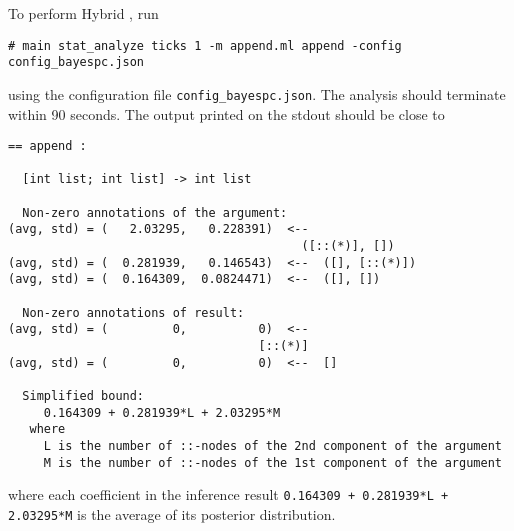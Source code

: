 To perform Hybrid \BayesPC{}, run
\begin{verbatim}
# main stat_analyze ticks 1 -m append.ml append -config config_bayespc.json
\end{verbatim}
using the configuration file \texttt{config\_bayespc.json}.
%
The analysis should terminate within 90 seconds.
%
The output printed on the stdout should be close to
\begin{verbatim}
== append :

  [int list; int list] -> int list

  Non-zero annotations of the argument:
(avg, std) = (   2.03295,   0.228391)  <--
                                         ([::(*)], [])
(avg, std) = (  0.281939,   0.146543)  <--  ([], [::(*)])
(avg, std) = (  0.164309,  0.0824471)  <--  ([], [])

  Non-zero annotations of result:
(avg, std) = (         0,          0)  <--
                                   [::(*)]
(avg, std) = (         0,          0)  <--  []

  Simplified bound:
     0.164309 + 0.281939*L + 2.03295*M
   where
     L is the number of ::-nodes of the 2nd component of the argument
     M is the number of ::-nodes of the 1st component of the argument
\end{verbatim}
where each coefficient in the inference result \texttt{0.164309 + 0.281939*L +
  2.03295*M} is the average of its posterior distribution.
